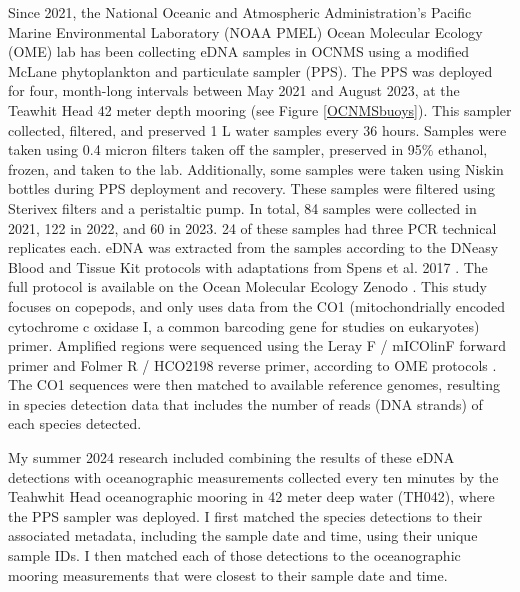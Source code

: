 \documentclass[12pt,twoside]{reedthesis}
\begin{document}
Since 2021, the National Oceanic and Atmospheric Administration's Pacific Marine Environmental Laboratory (NOAA PMEL) Ocean Molecular Ecology (OME) lab has been collecting eDNA samples in OCNMS using a modified McLane phytoplankton and particulate sampler (PPS).  The PPS was deployed for four, month-long intervals between May 2021 and August 2023, at the Teawhit Head 42 meter depth mooring (see Figure \ref{OCNMSbuoys}). This sampler collected, filtered, and preserved 1 L water samples every 36 hours. Samples were taken using 0.4 micron filters taken off the sampler, preserved in 95\% ethanol, frozen, and taken to the lab. Additionally, some samples were taken using Niskin bottles during PPS deployment and recovery. These samples were filtered using Sterivex filters and a peristaltic pump. In total, 84 samples were collected in 2021, 122 in 2022, and 60 in 2023. 24 of these samples had three PCR technical replicates each. eDNA was extracted from the samples according to the DNeasy Blood and Tissue Kit protocols with adaptations from Spens et al. 2017 \autocite{Spens2017}. The full protocol is available on the Ocean Molecular Ecology Zenodo \autocite{Weinrich2025}. This study focuses on copepods, and only uses data from the CO1 (mitochondrially encoded cytochrome c oxidase I, a common barcoding gene for studies on eukaryotes) primer. Amplified regions were sequenced using the  Leray F / mICOlinF forward primer and Folmer R / HCO2198 reverse primer, according to OME protocols \autocite{Gold2024, Spens2017}. The CO1 sequences were then matched to available reference genomes, resulting in species detection data that includes the number of reads (DNA strands) of each species detected.

My summer 2024 research included combining the results of these eDNA detections with oceanographic measurements collected every ten minutes by the Teahwhit Head oceanographic mooring in 42 meter deep water (TH042), where the PPS sampler was deployed. I first matched the species detections to their associated metadata, including the sample date and time, using their unique sample IDs. I then matched each of those detections to the oceanographic mooring measurements that were closest to their sample date and time.  
\end{document}
